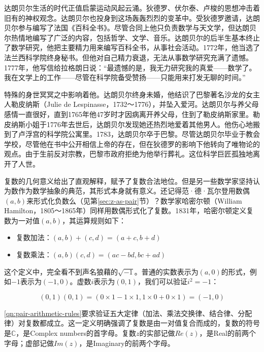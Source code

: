 \documentclass[b5paper]{ctexart}
\begin{document}
\begin{mdframed}
达朗贝尔生活的时代正值启蒙运动风起云涌。狄德罗、伏尔泰、卢梭的思想冲击着旧有的神权观念。达朗贝尔也投身到这场轰轰烈烈的变革中。受狄德罗邀请，达朗贝尔参与编写了法国《百科全书》。尽管合同上他只负责数学与天文学，但达朗贝尔热情地编写了广泛的内容，包括哲学、文学、音乐。达朗贝尔的后半生基本终止了数学研究，他把主要精力用来编写百科全书，从事社会活动。1772年，他当选了法兰西科学院终身秘书。但他对自己精力衰退，无法从事数学研究充满了遗憾。1777年，他写信给拉格朗日说\cite{MacTour-dAlembert}：“最遗憾的是，我无力研究我的真爱——数学了。我在文学上的工作——尽管在科学院备受赞扬——只能用来打发无聊的时间。”

特殊的身世冥冥之中影响着他。达朗贝尔终身未婚，他结识了巴黎著名沙龙的女主人勒皮纳斯（Julie de Lespinasse，1732～1776），并坠入爱河。达朗贝尔与养父母感情一直很好，直到1765年他47岁时才因病离开养父母，住到了勒皮纳斯家里。勒皮纳斯小姐于1776年去世后，达朗贝尔发现她还热烈地爱着其他男人。他伤心地搬到了卢浮宫的科学院公寓里\cite{Ronald-2024}。1783，达朗贝尔卒于巴黎。尽管达朗贝尔毕业于教会学校，尽管他在书中公开相信上帝的存在，但在狄德罗的影响下他转向了唯物论的观点。由于生前反对宗教，巴黎市政府拒绝为他举行葬礼。这位科学巨匠孤独地离开了人世。
\end{mdframed}

复数的几何意义给出了直观解释，赋予了复数合法地位。但是另一些数学家坚持认为数作为数学抽象的典范，其形式本身就有意义。还记得范·德·瓦尔登用数偶$(a, b)$来形式化负数么（见第\ref{sec:z-as-pair}节）？数学家哈密尔顿（William Hamilton，1805～1865年）同样用数偶形式化了复数。1831年，哈密尔顿定义复数为一对值$(a, b)$，其运算规则如下：

\begin{itemize}
\item 复数加法：$(a, b) + (c, d) = (a + c, b + d)$
\item 复数乘法：$(a, b) (c, d) = (ac - bd, bc + ad)$
\end{itemize}

这个定义中，完全看不到声名狼藉的$\sqrt{-1}$。普通的实数表示为$(a, 0)$的形式，例如$-1$表示为$(-1, 0)$。虚数$i$表示为$(0, 1)$，我们可以验证$i^2 = -1$：

\[(0, 1)(0, 1) = (0 \times 1 - 1 \times 1, 1 \times 0 + 0 \times 1) = (-1, 0)\]

\cref{qn:pair-arithmetic-rules}要求验证五大定律（加法、乘法交换律、结合律、分配律）对复数都成立。这一定义明确强调了复数是由一对值复合而成的，复数的符号是$\mathbb{C}$，是Complex numbers的首字母。复数$z$的实部记做$Re(z)$，是Real的前两个字母；虚部记做$Im(z)$，是Imaginary的前两个字母。
\end{document}
